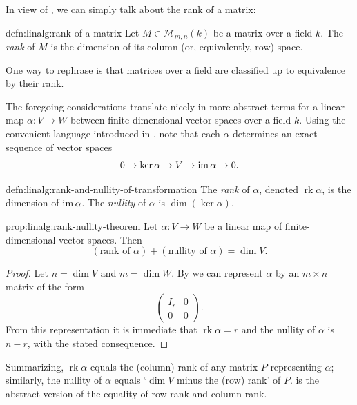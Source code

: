 In view of , we can simply talk about the rank of a
matrix:
\begin{defn}{}{defn:linalg:rank-of-a-matrix}
  Let $M \in \mathcal{M}_{m,n}(k)$ be a matrix over a field $k$. The
  \emph{rank} of $M$ is the dimension of its column (or, equivalently,
  row) space.
\end{defn}
One way to rephrase  is that matrices over a field
are classified up to equivalence by their rank.

The foregoing considerations translate nicely in more abstract terms
for a linear map $\alpha : V \to W$ between finite-dimensional vector
spaces over a field $k$. Using the convenient language introduced in
, note that each
$\alpha$ determines an exact sequence of vector spaces
\[
  0 \to \ker\alpha \to V \to \operatorname{im}\alpha \to 0.
\]
\begin{defn}{}{defn:linalg:rank-and-nullity-of-transformation}
  The \emph{rank} of $\alpha$, denoted $\operatorname{rk}\alpha$, is
  the dimension of $\operatorname{im}\alpha$. The \emph{nullity} of $\alpha$ is
  $\dim(\ker\alpha)$.
\end{defn}
\begin{prop}{}{prop:linalg:rank-nullity-theorem}
  Let $\alpha : V \to W$ be a linear map of finite-dimensional vector
  spaces. Then
  \[
    (\text{rank of } \alpha) + (\text{nullity of } \alpha) = \dim V.
  \]
\end{prop}
\begin{proof}
  Let $n = \dim V$ and $m = \dim W$. By  we can
  represent $\alpha$ by an $m \times n$ matrix of the form
  \[
    \left(
      \begin{array}{c|c}
        I_r & 0 \\
        \hline
        0 & 0
      \end{array}
    \right).
  \]
  From this representation it is immediate that
  $\operatorname{rk}\alpha = r$ and the nullity of $\alpha$ is
  $n - r$, with the stated consequence.
\end{proof}

Summarizing, $\operatorname{rk}\alpha$ equals the (column) rank of any
matrix $P$ representing $\alpha$; similarly, the nullity of $\alpha$
equals `$\dim V$ minus the (row) rank' of $P$.  is
the abstract version of the equality of row rank and column rank.

